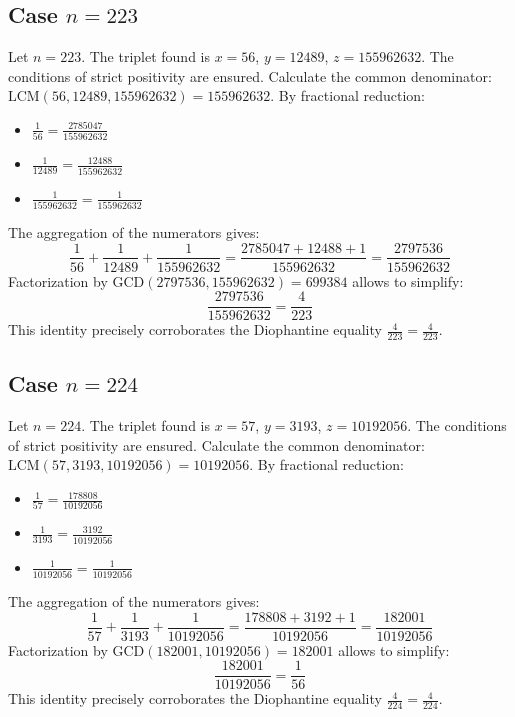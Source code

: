 \documentclass[11pt,a4paper]{article}
\begin{document}
\subsection{Case $n = 223$}
Let $n = 223$. The triplet found is $x = 56$, $y = 12489$, $z = 155962632$.
The conditions of strict positivity are ensured.
Calculate the common denominator: $\text{LCM}(56, 12489, 155962632) = 155962632$.
By fractional reduction:
\begin{itemize}
    \item $\frac{1}{56} = \frac{2785047}{155962632}$
    \item $\frac{1}{12489} = \frac{12488}{155962632}$
    \item $\frac{1}{155962632} = \frac{1}{155962632}$
\end{itemize}
The aggregation of the numerators gives:
$$ \frac{1}{56} + \frac{1}{12489} + \frac{1}{155962632} = \frac{2785047 + 12488 + 1}{155962632} = \frac{2797536}{155962632} $$
Factorization by $\text{GCD}(2797536, 155962632) = 699384$ allows to simplify:
$$ \frac{2797536}{155962632} = \frac{4}{223} $$
This identity precisely corroborates the Diophantine equality $\frac{4}{223} = \frac{4}{223}$.

\subsection{Case $n = 224$}
Let $n = 224$. The triplet found is $x = 57$, $y = 3193$, $z = 10192056$.
The conditions of strict positivity are ensured.
Calculate the common denominator: $\text{LCM}(57, 3193, 10192056) = 10192056$.
By fractional reduction:
\begin{itemize}
    \item $\frac{1}{57} = \frac{178808}{10192056}$
    \item $\frac{1}{3193} = \frac{3192}{10192056}$
    \item $\frac{1}{10192056} = \frac{1}{10192056}$
\end{itemize}
The aggregation of the numerators gives:
$$ \frac{1}{57} + \frac{1}{3193} + \frac{1}{10192056} = \frac{178808 + 3192 + 1}{10192056} = \frac{182001}{10192056} $$
Factorization by $\text{GCD}(182001, 10192056) = 182001$ allows to simplify:
$$ \frac{182001}{10192056} = \frac{1}{56} $$
This identity precisely corroborates the Diophantine equality $\frac{4}{224} = \frac{4}{224}$.
\end{document}
